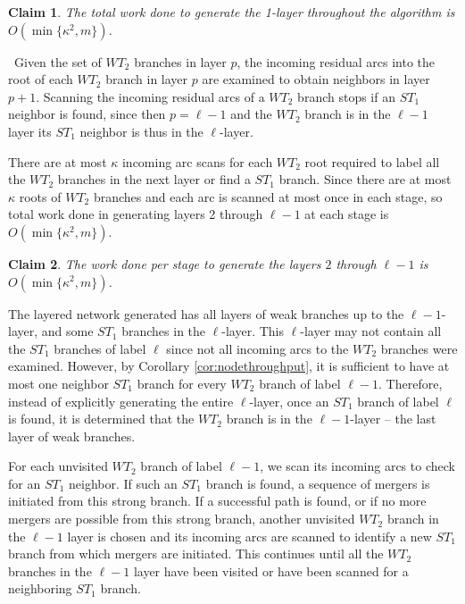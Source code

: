 \documentclass{article}
\newtheorem{claim}{Claim}[section]
\begin{document}
\begin{claim}
The total work done to generate the 1-layer {\em throughout the algorithm} is $O(\min\{\kappa^2, m\})$.
\end{claim}

~Given the set of $WT_2$ branches in layer $p$, the incoming residual arcs into the root of each $WT_2$ branch in layer $p$ are examined to obtain neighbors in layer $p+1$. Scanning the incoming residual arcs of a $WT_2$ branch stops if an $ST_1$ neighbor is found, since then $p=\ell -1$ and the $WT_2$ branch is in the $\ell-1$ layer its $ST_1$ neighbor is thus in the $\ell$-layer.

There are at most $\kappa$ incoming arc scans for each $WT_2$ root required to label all the $WT_2$ branches in the next layer or find a $ST_1$ branch.   Since there are at most $\kappa$ roots of $WT_2$ branches and each arc is scanned at most once in each stage, so total work done in generating layers 2 through $\ell-1$ at each stage is $O(\min\{\kappa^2, m\})$.

\begin{claim}
The work done per stage to generate the layers $2$ through $\ell-1$ is $O(\min\{\kappa^2, m\})$.
\end{claim}

The layered network generated has all layers of weak branches up to the $\ell-1$-layer, and some $ST_1$ branches in the $\ell$-layer. This $\ell$-layer may not contain all the $ST_1$ branches of label $\ell$ since not all incoming arcs to the $WT_2$ branches were examined. However, by Corollary \ref{cor:nodethroughput}, it is sufficient to have at most one neighbor $ST_1$ branch for every $WT_2$ branch of label $\ell-1$. Therefore, instead of explicitly generating the entire $\ell$-layer, once an $ST_1$ branch of label $\ell$ is found, it is determined that the $WT_2$ branch is in the $\ell-1$-layer -- the last layer of weak branches.

For each unvisited $WT_2$ branch of label $\ell-1$, we scan its incoming arcs to check for an $ST_1$ neighbor. If such an $ST_1$ branch is found, a sequence of mergers is initiated from this strong branch. If a successful path is found, or if no more mergers are possible from this strong branch, another unvisited $WT_2$ branch in the $\ell-1$ layer is chosen and its incoming arcs are scanned to identify a new $ST_1$ branch from which mergers are initiated. This continues until all the $WT_2$ branches in the $\ell-1$ layer have been visited or have been scanned for a neighboring $ST_1$ branch.
\end{document}
